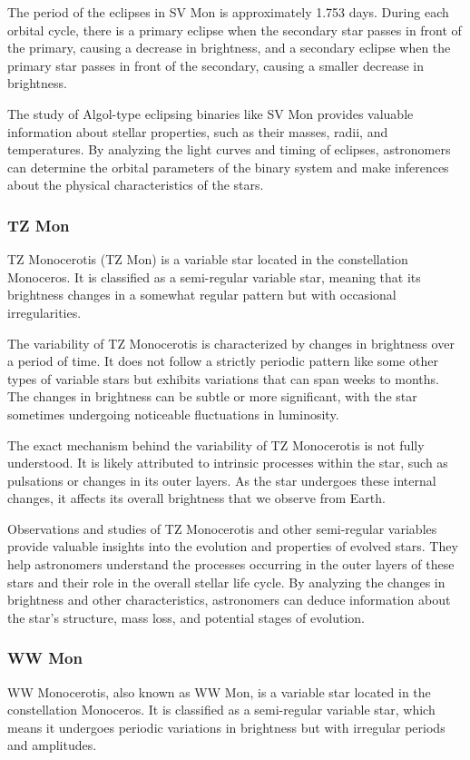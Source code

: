 The period of the eclipses in SV Mon is approximately 1.753 days. During each orbital cycle, there is a primary eclipse when the secondary star passes in front of the primary, causing a decrease in brightness, and a secondary eclipse when the primary star passes in front of the secondary, causing a smaller decrease in brightness.

The study of Algol-type eclipsing binaries like SV Mon provides valuable information about stellar properties, such as their masses, radii, and temperatures. By analyzing the light curves and timing of eclipses, astronomers can determine the orbital parameters of the binary system and make inferences about the physical characteristics of the stars.

\subsubsection*{ TZ Mon }
TZ Monocerotis (TZ Mon) is a variable star located in the constellation Monoceros. It is classified as a semi-regular variable star, meaning that its brightness changes in a somewhat regular pattern but with occasional irregularities.

The variability of TZ Monocerotis is characterized by changes in brightness over a period of time. It does not follow a strictly periodic pattern like some other types of variable stars but exhibits variations that can span weeks to months. The changes in brightness can be subtle or more significant, with the star sometimes undergoing noticeable fluctuations in luminosity.

The exact mechanism behind the variability of TZ Monocerotis is not fully understood. It is likely attributed to intrinsic processes within the star, such as pulsations or changes in its outer layers. As the star undergoes these internal changes, it affects its overall brightness that we observe from Earth.

Observations and studies of TZ Monocerotis and other semi-regular variables provide valuable insights into the evolution and properties of evolved stars. They help astronomers understand the processes occurring in the outer layers of these stars and their role in the overall stellar life cycle. By analyzing the changes in brightness and other characteristics, astronomers can deduce information about the star's structure, mass loss, and potential stages of evolution.

\subsubsection*{ WW Mon }
WW Monocerotis, also known as WW Mon, is a variable star located in the constellation Monoceros. It is classified as a semi-regular variable star, which means it undergoes periodic variations in brightness but with irregular periods and amplitudes.

